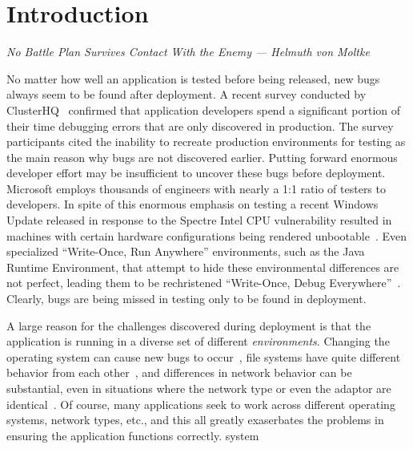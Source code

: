 \section{Introduction}

\textit{No Battle Plan Survives Contact With the Enemy --- Helmuth von Moltke}

No matter how well an application is tested before being released, new 
bugs always seem to be found after deployment.
A recent survey conducted by
ClusterHQ~\cite{ClusterHQSurvey} confirmed that application developers
spend a significant portion of their time debugging errors that are only discovered
in production.  The survey participants cited the inability to
recreate production environments for testing as the main reason why
bugs are not discovered earlier.
Putting forward enormous developer effort
may be insufficient to uncover
these bugs before deployment.
Microsoft employs thousands of engineers with nearly a 1:1 ratio of testers to
developers\cite{Page2009}.
In spite of this enormous emphasis on testing a recent Windows Update released
in response to the Spectre Intel CPU vulnerability resulted in machines with
certain hardware configurations being rendered unbootable~\cite{kb4056892}.
Even specialized ``Write-Once, Run Anywhere'' environments, such as the Java
Runtime Environment, that attempt to hide these environmental differences are
not perfect, leading them to be rechristened ``Write-Once, Debug
Everywhere''~\cite{WODE}.
Clearly, bugs are
being missed in testing only to be found in deployment.

A large reason for the challenges discovered during deployment is that the 
application is running in a diverse set of different \emph{environments}.  
Changing the operating system can cause new bugs to occur~\cite{LinuxGlibcChanges}, file
systems have quite different behavior from each other~\cite{EXT4Layout}\cite{AppleHFS}, and differences
in network behavior can be substantial, even in situations where the network
type or even the adaptor are identical~\cite{vbox}.  Of course, many applications
seek to work across different operating systems, network types, etc., and this
all greatly exaserbates the problems in ensuring the application functions
correctly.
system


